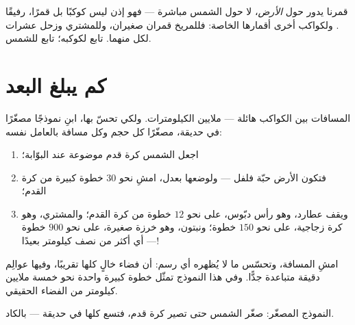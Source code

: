 \begin{example}\label{ex:g4:solar-system:moons}
قمرنا يدور حول \emph{الأرض}، لا حول الشمس مباشرة --- فهو إذن
ليس كوكبًا بل قمرًا، رفيقًا . ولكواكب أخرى أقمارها الخاصة:
فللمريخ قمران صغيران، وللمشتري وزحل عشرات لكل منهما. 
تابع لكوكبه؛  تابع للشمس.
\end{example}

\section{كم يبلغ البعد}

\begin{method}\label{met:g4:solar-system:model}
المسافات بين الكواكب هائلة --- ملايين الكيلومترات. ولكي تحسّ
بها، ابنِ نموذجًا مصغّرًا  في حديقة، مصغّرًا كل
حجم وكل مسافة بالعامل نفسه:
\begin{enumerate}
  \item اجعل الشمس كرة قدم موضوعة عند البوّابة؛
  \item فتكون الأرض حبّة فلفل --- ولوضعها بعدل، امشِ نحو $30$
        خطوة كبيرة من كرة القدم؛
  \item ويقف عطارد، وهو رأس دبّوس، على نحو $12$ خطوة من كرة
        القدم؛ والمشتري، وهو كرة زجاجية، على نحو $150$ خطوة؛
        ونبتون، وهو خرزة صغيرة، على نحو $900$ خطوة --- أي أكثر
        من نصف كيلومتر بعيدًا!
\end{enumerate}
امشِ المسافة، وتحسّس ما لا يُظهره أي رسم: أن 
فضاء خالٍ كلها تقريبًا، وفيها عوالِم دقيقة متباعدة جدًّا. وفي
هذا النموذج تمثّل خطوة كبيرة واحدة نحو خمسة ملايين كيلومتر من
الفضاء الحقيقي.
\end{method}

\begin{omfigure}

{\small النموذج المصغّر: صغّر الشمس حتى تصير كرة قدم، فتسع
 كلها في حديقة --- بالكاد.}
\end{omfigure}

